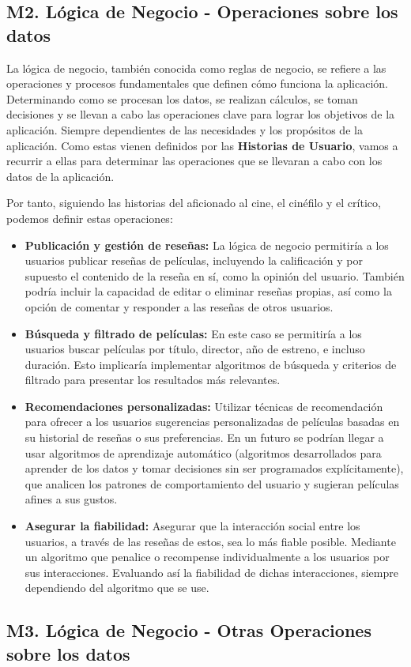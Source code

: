 \subsection{M2. Lógica de Negocio - Operaciones sobre los datos}

La lógica de negocio, también conocida como reglas de negocio, se refiere a las operaciones y procesos fundamentales que definen cómo funciona la aplicación. Determinando como se procesan los datos, se realizan cálculos, se toman decisiones y se llevan a cabo las operaciones clave para lograr los objetivos de la aplicación. Siempre dependientes de las necesidades y los propósitos de la aplicación. Como estas vienen definidos por las \textbf{Historias de Usuario}, vamos a recurrir a ellas para determinar las operaciones que se llevaran a cabo con los datos de la aplicación. 

Por tanto, siguiendo las historias del aficionado al cine, el cinéfilo y el crítico, podemos definir estas operaciones:

\begin{itemize}
\item \textbf{Publicación y gestión de reseñas:} La lógica de negocio permitiría a los usuarios publicar reseñas de películas, incluyendo la calificación y por supuesto el contenido de la reseña en sí, como la opinión del usuario. También podría incluir la capacidad de editar o eliminar reseñas propias, así como la opción de comentar y responder a las reseñas de otros usuarios.
\item \textbf{Búsqueda y filtrado de películas:} En este caso se permitiría a los usuarios buscar películas por título, director, año de estreno, e incluso duración. Esto implicaría implementar algoritmos de búsqueda y criterios de filtrado para presentar los resultados más relevantes. 
\item \textbf{Recomendaciones personalizadas:} Utilizar técnicas de recomendación para ofrecer a los usuarios sugerencias personalizadas de películas basadas en su historial de reseñas o sus preferencias. En un futuro se podrían llegar a usar algoritmos de aprendizaje automático (algoritmos desarrollados para aprender de los datos y tomar decisiones sin ser programados explícitamente), que analicen los patrones de comportamiento del usuario y sugieran películas afines a sus gustos.
\item \textbf{Asegurar la fiabilidad:} Asegurar que la interacción social entre los usuarios, a través de las reseñas de estos, sea lo más fiable posible. Mediante un algoritmo que penalice o recompense individualmente a los usuarios por sus interacciones. Evaluando así la fiabilidad de dichas interacciones, siempre dependiendo del algoritmo que se use.
\end{itemize}

\subsection{M3. Lógica de Negocio - Otras Operaciones sobre los datos}

